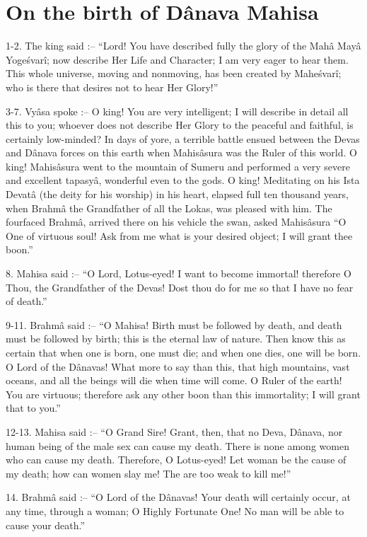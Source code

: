 ﻿\chapter{On the birth of D\^anava Mahisa}

1-2. The king said :-- ``Lord! You have described fully the glory of the Mah\^a May\^a Yoge\'svar\^i; now describe Her Life and Character; I am very eager to hear them. This whole universe, moving and nonmoving, has been created by Mahe\'svar\^i; who is there that desires not to hear Her Glory!''

3-7. Vy\^asa spoke :-- O king! You are very intelligent; I will describe in detail all this to you; whoever does not describe Her Glory to the peaceful and faithful, is certainly low-minded? In days of yore, a terrible battle ensued between the Devas and D\^anava forces on this earth when Mahis\^asura was the Ruler of this world. O king! Mahis\^asura went to the mountain of Sumeru and performed a very severe and excellent tapasy\^a, wonderful even to the gods. O king! Meditating on his Ista Devat\^a (the deity for his worship) in his heart, elapsed full ten thousand years, when Brahm\^a the Grandfather of all the Lokas, was pleased with him. The fourfaced Brahm\^a, arrived there on his vehicle the swan, asked Mahis\^asura ``O One of virtuous soul! Ask from me what is your desired object; I will grant thee boon.''

8. Mahisa said :-- ``O Lord, Lotus-eyed! I want to become immortal! therefore O Thou, the Grandfather of the Devas! Dost thou do for me so that I have no fear of death.''

9-11. Brahm\^a said :-- ``O Mahisa! Birth must be followed by death, and death must be followed by birth; this is the eternal law of nature. Then know this as certain that when one is born, one must die; and when one dies, one will be born. O Lord of the D\^anavas! What more to say than this, that high mountains, vast oceans, and all the beings will die when time will come. O Ruler of the earth! You are virtuous; therefore ask any other boon than this immortality; I will grant that to you.''

12-13. Mahisa said :-- ``O Grand Sire! Grant, then, that no Deva, D\^anava, nor human being of the male sex can cause my death. There is none among women who can cause my death. Therefore, O Lotus-eyed! Let woman be the cause of my death; how can women slay me! The are too weak to kill me!''

14. Brahm\^a said :-- ``O Lord of the D\^anavas! Your death will certainly occur, at any time, through a woman; O Highly Fortunate One! No man will be able to cause your death.''

